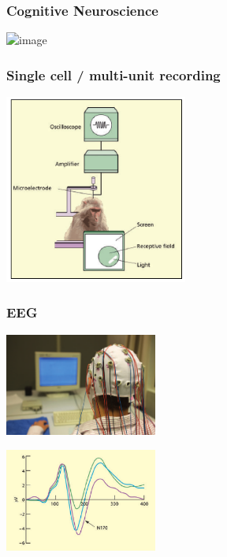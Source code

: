 \documentclass[]{beamer}
\begin{document}
\begin{frame}
\frametitle{Cognitive Neuroscience}
 \includegraphics<1>[width=110mm]{figs/methods_overview.png}
\end{frame}



\begin{frame}
 \frametitle{Single cell / multi-unit recording}
\begin{center}
\includegraphics[width=60mm]{figs/l3/ward_single_cell_recording.png} 
\end{center}
\end{frame}

\begin{frame}
 \frametitle{EEG}
\begin{center}
\includegraphics[width=50mm]{figs/l1/eeg_cap.png} 

\vspace{3mm}
\includegraphics[width=50mm]{figs/l1/erp_face_animal_object.png} 
\end{center}
\end{frame}
\end{document}

